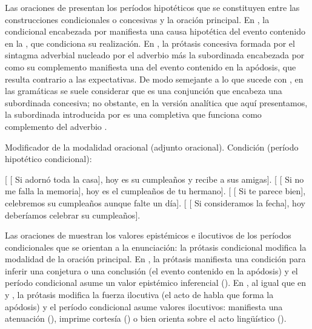 Las oraciones de  presentan los períodos hipotéticos que se
constituyen entre las construcciones condicionales  o
concesivas  y la oración principal. En ,
la  condicional encabezada por  manifiesta una causa
hipotética del evento contenido en la , que condiciona su
realización. En , la prótasis concesiva formada por el
sintagma adverbial nucleado por el adverbio  más la subordinada
encabezada por  como su complemento manifiesta una  del evento contenido en la apódosis, que resulta contrario a las
expectativas. De modo semejante a lo que sucede con , en las
gramáticas se suele considerar que  es una conjunción que encabeza
una subordinada concesiva; no obstante, en la versión analítica que aquí
presentamos, la subordinada introducida por  es una completiva que
funciona como complemento del adverbio .

\begin{exe}
  \ex\label{ex:13-mmocond} Modificador de la modalidad oracional (adjunto
      oracional). Condición (período hipotético condicional):
    \begin{xlist}
      \ex\label{ex:13-mmocond-a} {}[ [ Si adornó toda la casa],
          hoy es su cumpleaños y recibe a sus amigas].
      \ex\label{ex:13-mmocond-b} {}[ [ Si no me falla la
          memoria], hoy es el cumpleaños de tu hermano].
      \ex\label{ex:13-mmocond-c} {}[ [ Si te parece bien],
          celebremos su cumpleaños aunque falte un día].
      \ex\label{ex:13-mmocond-d} {}[ [ Si consideramos la
          fecha], hoy deberíamos celebrar su cumpleaños].
    \end{xlist}
\end{exe}

Las oraciones de  muestran los valores epistémicos e
ilocutivos de los períodos condicionales que se orientan a la enunciación: la
prótasis condicional modifica la modalidad de la oración principal. En
, la prótasis manifiesta una condición para inferir una
conjetura o una conclusión (el evento contenido en la apódosis) y el período
condicional asume un valor epistémico inferencial (). En
, al igual que en  y
, la prótasis modifica la fuerza ilocutiva (el acto de
habla que forma la apódosis) y el período condicional asume valores ilocutivos:
manifiesta una atenuación (), imprime cortesía () o bien
orienta sobre el acto lingüístico ().

